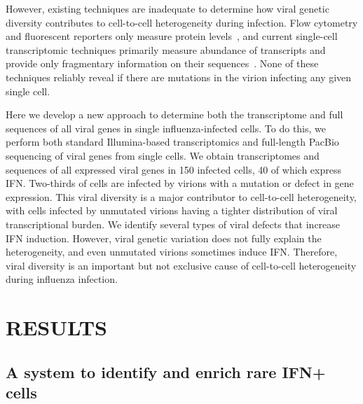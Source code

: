 \documentclass[10pt,letterpaper]{article}
\begin{document}
However, existing techniques are inadequate to determine how viral genetic diversity contributes to cell-to-cell heterogeneity during infection.
Flow cytometry and fluorescent reporters only measure protein levels~\citep{brooke2013most, guo2017single}, and current single-cell transcriptomic techniques primarily measure abundance of transcripts and provide only fragmentary information on their sequences~\citep{russell2018extreme, zanini2018single, zanini2018virus, steuerman2018dissection, saikia2018simultaneous, oneal2018west}.
None of these techniques reliably reveal if there are mutations in the virion infecting any given single cell.

Here we develop a new approach to determine both the transcriptome and full sequences of all viral genes in single influenza-infected cells.
To do this, we perform both standard Illumina-based transcriptomics and full-length PacBio sequencing of viral genes from single cells.
We obtain transcriptomes and sequences of all expressed viral genes in 150 infected cells, 40 of which express IFN.
Two-thirds of cells are infected by virions with a mutation or defect in gene expression.
This viral diversity is a major contributor to cell-to-cell heterogeneity, with cells infected by unmutated virions having a tighter distribution of viral transcriptional burden.
We identify several types of viral defects that increase IFN induction.
However, viral genetic variation does not fully explain the heterogeneity, and even unmutated virions sometimes induce IFN.
Therefore, viral diversity is an important but not exclusive cause of cell-to-cell heterogeneity during influenza infection.

\section*{RESULTS}

\subsection*{A system to identify and enrich rare IFN+ cells}
\end{document}
